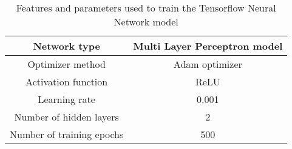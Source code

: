\begin{table}[H]
 \centering
	\begin{tabular}{|c|c|}
	 \hline
	 Network type & Multi Layer Perceptron model\\
	 \hline
	 Optimizer method & Adam optimizer\\
	 \hline
	 Activation function & ReLU\\
	 \hline
	 Learning rate & 0.001\\
	 \hline
	 Number of hidden layers & 2\\
	 \hline
	 Number of training epochs & 500\\
	 \hline
	\end{tabular}
\caption{Features and parameters used to train the Tensorflow Neural Network model}
\label{table:2.2}
\end{table}








